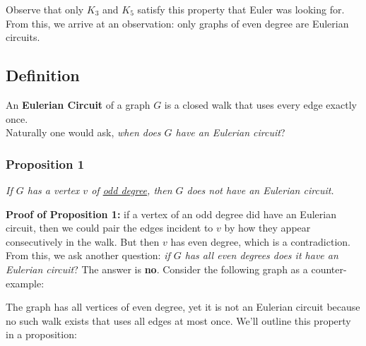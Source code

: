 \documentclass{report}
\begin{document}
Observe that only $K_3$ and $K_5$ satisfy this property that Euler was looking for. From this, we arrive at an observation: only graphs of even degree are Eulerian circuits.
\subsection{Definition}
An \textbf{Eulerian Circuit} of a graph $G$ is a closed walk that uses every edge exactly once.\\
Naturally one would ask, \textit{when does $G$ have an Eulerian circuit}?
\subsubsection{Proposition 1}
\begin{center}
\textit{If $G$ has a vertex $v$ of \underline{odd degree}, then $G$ does not have an Eulerian circuit.}
\end{center}
\textbf{Proof of Proposition 1:} if a vertex of an odd degree did have an Eulerian circuit, then we could pair the edges incident to $v$ by how they appear consecutively in the walk. But then $v$ has even degree, which is a contradiction. \\
From this, we ask another question: \textit{if $G$ has all even degrees does it have an Eulerian circuit}? The answer is \textbf{no}. Consider the following graph as a counter-example:
\begin{center}
\end{center}
The graph has all vertices of even degree, yet it is not an Eulerian circuit because no such walk exists that uses all edges at most once. We'll outline this property in a proposition:
\end{document}
